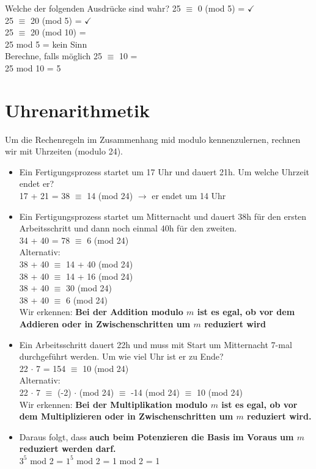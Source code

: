 Welche der folgenden Ausdrücke sind wahr?
25 $\equiv$ 0 (mod 5) = $\checkmark$ \\
25 $\equiv$ 20 (mod 5) = $\checkmark$ \\
25 $\equiv$ 20 (mod 10) = \Lightning \\
25 mod 5 = kein Sinn \\

Berechne, falls möglich
25 $\equiv$ 10 = \Lightning \\
25 mod 10 = 5 
\section{Uhrenarithmetik}
Um die Rechenregeln im Zusammenhang mid modulo kennenzulernen, rechnen wir mit Uhrzeiten (modulo 24).
\begin{itemize}
	\item Ein Fertigungsprozess startet um 17 Uhr und dauert 21h. Um welche Uhrzeit endet er? \\
	17 + 21 = 38 $\equiv$ 14 (mod 24) $\rightarrow$ er endet um 14 Uhr
	\item Ein Fertigungsprozess startet um Mitternacht und dauert 38h für den ersten Arbeitsschritt und dann noch einmal 40h für den zweiten. \\
	34 + 40 = 78 $\equiv$ 6 (mod 24) \\
	Alternativ: \\
	38 + 40 $\equiv$ 14 + 40 (mod 24) \\
	38 + 40 $\equiv$ 14 + 16 (mod 24) \\
	38 + 40 $\equiv$ 30 (mod 24) \\
	38 + 40 $\equiv$ 6 (mod 24) \\
	Wir erkennen: \textbf{Bei der Addition modulo $m$ ist es egal, ob vor dem Addieren oder in Zwischenschritten um $m$ reduziert wird}
	\item Ein Arbeitsschritt dauert 22h und muss mit Start um Mitternacht 7-mal durchgeführt werden. Um wie viel Uhr ist er zu Ende? \\
	22 $\cdot$ 7 = 154 $\equiv$ 10 (mod 24) \\
	Alternativ: \\
	22 $\cdot$ 7 $\equiv$ (-2) $\cdot$ (mod 24) $\equiv$ -14 (mod 24) $\equiv$ 10 (mod 24) \\
	Wir erkennen: \textbf{Bei der Multiplikation modulo $m$ ist es egal, ob vor dem Multiplizieren oder in Zwischenschritten um $m$ reduziert wird.}
	\item Daraus folgt, dass \textbf{auch beim Potenzieren die Basis im Voraus um $m$ reduziert werden darf.} \\
	$3^5$ mod 2 = $1^5$ mod 2 = 1 mod 2 = 1
\end{itemize}
	
